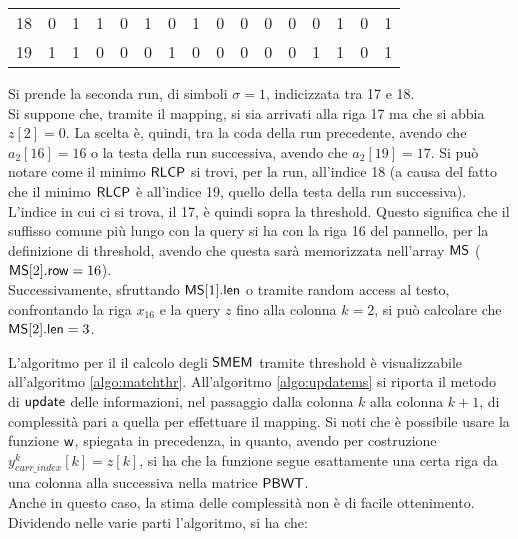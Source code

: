 \begin{esempio}
\begin{table}[H]
\begin{tabular}{c|cc|c|cccccccccccc}
      18 & 0 & 1 & 1 & 0 & 1 & 0 & 1 & 0 & 0 & 0 & 0 & 0 & 1 & 0 & 1 \\
      19 & 1 & 1 & 0 & 0 & 0 & 1 & 0 & 0 & 0 & 0 & 0 & 1 & 1 & 0 & 1 \\
    \end{tabular}
  \end{table}
  \noindent
  Si prende la seconda run, di simboli $\sigma=1$, indicizzata tra 17 e 18. \\
  Si suppone che, tramite il mapping, si sia arrivati alla riga 17 ma che si
  abbia $z[2]=0$. La scelta è, quindi, tra la coda della run precedente, avendo
  che $a_2[16]=16$ o la testa della run successiva, avendo che $a_2[19]=17$. Si
  può notare come il minimo $\mbox{\rm {\sf RLCP}}$ si trovi, per la 
  run, all'indice 18 (a causa del fatto che il minimo $\mbox{\rm {\sf RLCP}}$ è all'indice
  19, quello della testa della run successiva). L'indice in cui ci si trova, il
  17, è quindi sopra la threshold.
  Questo significa che il suffisso comune più lungo
  con la query si ha 
  con la riga 16 del pannello, per la definizione di threshold, avendo che
  questa sarà memorizzata nell'array $\mbox{\rm {\sf MS}}$ ($\mbox{\rm {\sf MS}}[2].\mbox{\rm {\sf row}}=16$).\\
  Successivamente,  sfruttando $\mbox{\rm {\sf MS}}[1].\mbox{\rm {\sf len}}$ o tramite random access al testo,
  confrontando la riga 
  $x_{16}$ e la query $z$ fino alla colonna $k=2$, si può calcolare che
  $\mbox{\rm {\sf MS}}[2].\mbox{\rm {\sf len}}=3$. 
\end{esempio}
L'algoritmo per il il calcolo degli $\mbox{\rm {\sf SMEM}}$ tramite threshold è visualizzabile
all'algoritmo \ref{algo:matchthr}. All'algoritmo \ref{algo:updatems}
si riporta il metodo di $\mbox{\rm {\sf update}}$ delle informazioni, nel passaggio dalla
colonna 
$k$ alla colonna $k+1$, di complessità pari a quella per effettuare il
mapping. Si noti che è 
possibile usare la funzione $\mbox{\rm {\sf w}}$, 
spiegata in precedenza, in quanto, avendo per costruzione
$y^k_{curr\_index}[k]=z[k]$, si ha
che la funzione segue esattamente una certa riga da una colonna alla
successiva nella matrice $\mbox{\rm {\sf PBWT}}$. \\
Anche in questo caso, la stima delle
complessità non è di facile ottenimento. Dividendo nelle varie parti
l'algoritmo, si ha che:
